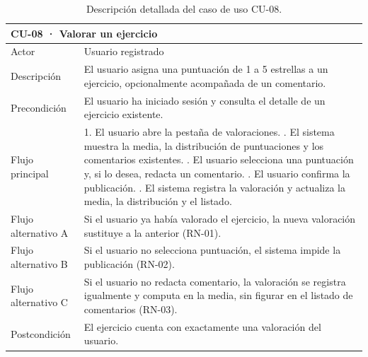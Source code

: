 \documentclass[12pt,a4paper,twoside,openright]{book}
\begin{document}
    \begin{table}[htbp]
        \centering
        \small
        \begin{tabular}{p{2.7cm} p{9.8cm}}
            \toprule
            \multicolumn{2}{l}{\textbf{CU-08 · Valorar un ejercicio}} \\
            \midrule
            Actor & Usuario registrado \\
            Descripción & El usuario asigna una puntuación de 1 a 5 estrellas a un ejercicio, opcionalmente acompañada de un comentario. \\
            Precondición & El usuario ha iniciado sesión y consulta el detalle de un ejercicio existente. \\
            Flujo principal & 1. El usuario abre la pestaña de valoraciones. \newline
                              2. El sistema muestra la media, la distribución de puntuaciones y los comentarios existentes. \newline
                              3. El usuario selecciona una puntuación y, si lo desea, redacta un comentario. \newline
                              4. El usuario confirma la publicación. \newline
                              5. El sistema registra la valoración y actualiza la media, la distribución y el listado. \\
            Flujo alternativo A & Si el usuario ya había valorado el ejercicio, la nueva valoración sustituye a la anterior (RN-01). \\
            Flujo alternativo B & Si el usuario no selecciona puntuación, el sistema impide la publicación (RN-02). \\
            Flujo alternativo C & Si el usuario no redacta comentario, la valoración se registra igualmente y computa en la media, sin figurar en el listado de comentarios (RN-03). \\
            Postcondición & El ejercicio cuenta con exactamente una valoración del usuario. \\
            \bottomrule
        \end{tabular}
        \caption{Descripción detallada del caso de uso CU-08.}
        \label{tab:cu-08}
    \end{table}
\end{document}
